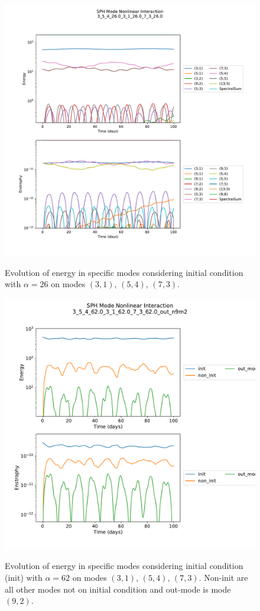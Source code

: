 \documentclass[a4paper,10pt]{article}
\begin{document}
\begin{figure}
\centering
 \includegraphics[scale=0.6]{figs/mode_evol_TC2-9-2.pdf}
 \label{tc2-alpha26}
 \caption{Evolution of energy in specific modes considering initial condition with $\alpha=26$ on modes $(3,1)$, $(5,4)$, $(7,3)$.}
\end{figure}



\begin{figure}
\centering
 \includegraphics[scale=0.6]{figs/out_n9m2-alpha62.pdf}
 \label{tc2-alpha62}
 \caption{Evolution of energy in specific modes considering initial condition (init) with $\alpha=62$ on modes $(3,1)$, $(5,4)$, $(7,3)$. Non-init are all other modes not on initial condition and out-mode is mode $(9,2)$.}
\end{figure}
\end{document}
